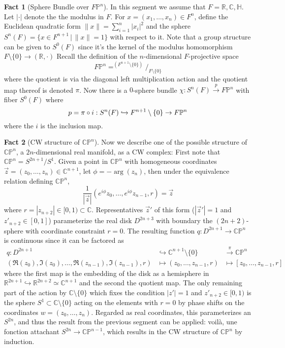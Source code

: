 \documentclass[10pt]{report}
\theoremstyle{definition}
\newtheorem{fact}{Fact}
\begin{document}
\begin{fact}[Sphere Bundle over $F\mathbb{P}^n$] In this segment we assume that $F=\mathbb{R},\mathbb{C},\mathbb{H}$. Let $|\cdot|$ denote the the modulus in $F$. For $x=(x_1,\dots,x_n)\in F^n$, define the Euclidean quadratic form $\lVert x\rVert=\sum_{i=1}^n|x_i|^2$ and the sphere $S^n(F)=\{x\in F^{n+1}\,\big|\,\lVert x\rVert=1\}$ with respect to it. Note that a group structure can be given to $S^0(F)$ since it's the kernel of the modulus homomorphism $F\setminus\{0\}\to(\mathbb{R},\cdot)$ Recall the definition of the $n$-dimensional $F$-projective space $$F\mathbb{P}^n=^{(F^{n+1}\setminus\{0\})}\big/_{F\setminus\{0\}}$$ where the quotient is via the diagonal left multiplication action and the quotient map thereof is denoted $\pi$. Now there is a $0$-sphere bundle $\chi:S^n(F)\overset{p}{\to}F\mathbb{P}^n$ with fiber $S^0(F)$ where $$p=\pi\circ i:S^n(F)\xhookrightarrow{}F^{n+1}\setminus\{0\}\to F\mathbb{P}^n$$ where the $i$ is the inclusion map.
\end{fact}

\begin{fact}[CW structure of $\mathbb{CP}^{n}$]\label{fact:cw_sturecture_of_cpn} Now we describe one of the possible structure of $\mathbb{CP}^{n}$, a $2n$-dimensional real manifold, as a CW complex: First note that $\mathbb{CP}^{n}=S^{2n+1}/S^1$. Given a point in $\mathbb{CP}^{n}$ with homogeneous coordinates $\vec{z}=(z_0,\dots,z_{n})\in\mathbb{C}^{n+1}$, let $\phi=-\arg(z_{n})$, then under the equivalence relation defining $\mathbb{CP}^{n}$, $$\frac{1}{|\vec{z}|}(e^{i\phi}z_0,\dots,e^{i\phi}z_{n-1},r)=\vec{z}$$ where $r=|z_{n+2}|\in[0,1)\subset\mathbb{C}$. Representatives $\vec{z}'$ of this form ($|\vec{z}'|=1$ and $z'_{n+2}\in[0,1]$) parameterize the real disk $D^{2n+3}$ with boundary the $(2n+2)$-sphere with coordinate constraint $r=0$. The resulting function $q:D^{2n+1}\to\mathbb{CP}^{n}$ is continuous since it can be factored as
\begin{align*}
q:D^{2n+1}&\hookrightarrow\mathbb{C}^{n+1}\setminus\{0\}&\overset{\pi}{\to}\mathbb{CP}^{n}\\
(\Re(z_0),\Im(z_0),\dots,\Re(z_{n-1}),\Im(z_{n-1}),r)&\mapsto(z_0,\dots,z_{n-1},r)&\mapsto[z_0,\dots,z_{n-1},r]&
\end{align*}
where the first map is the embedding of the disk as a hemisphere in $\mathbb{R}^{2n+1}\hookrightarrow\mathbb{R}^{2n+2}\simeq\mathbb{C}^{n+1}$ and the second the quotient map. The only remaining part of the action by $\mathbb{C}\setminus\{0\}$ which fixes the condition $|z'|=1$ and $z'_{n+2}\in[0,1)$ is the sphere $S^1\subset\mathbb{C}\setminus\{0\}$ acting on the elements with $r=0$ by phase shifts on the coordinates $w=(z_0,\dots,z_{n})$. Regarded as real coordinates, this parameterizes an $S^{2n}$, and thus the result from the previous segment can be applied: voil\`a, une fonction attachant $S^{2n}\to\mathbb{CP}^{n-1}$, which results in the CW structure of $\mathbb{CP}^{n}$ by induction.
\end{fact}
\end{document}

